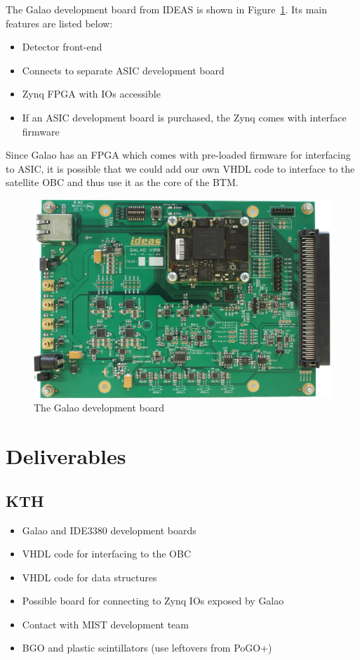 \documentclass[a4paper,11pt]{article}
\begin{document}
The Galao development board from IDEAS is shown in Figure~\ref{fig:galao}. Its
main features are listed below:

\begin{itemize}
  \item Detector front-end
  \item Connects to separate ASIC development board
  \item Zynq FPGA with IOs accessible
  \item If an ASIC development board is purchased, the Zynq comes with interface
  firmware
\end{itemize}

Since Galao has an FPGA which comes with pre-loaded firmware for interfacing to
ASIC, it is possible that we could add our own VHDL code to interface to the
satellite OBC and thus use it as the core of the BTM.

\begin{figure}[h]
  \centerline{\includegraphics[width=.6\textwidth]{fig/galao.jpg}}
  \caption{\label{fig:galao} The Galao development board}
\end{figure}

\section{Deliverables}

\subsection{KTH}

\begin{itemize}
  \item Galao and IDE3380 development boards
  \item VHDL code for interfacing to the OBC
  \item VHDL code for data structures
  \item Possible board for connecting to Zynq IOs exposed by Galao
  \item Contact with MIST development team
  \item BGO and plastic scintillators (use leftovers from PoGO+)
\end{itemize}
\end{document}
